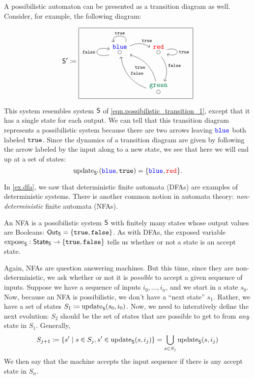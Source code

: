 \documentclass[DynamicalBook]{subfiles}
\begin{document}
\begin{example}\label{ex.transition_possible}
  A possibilistic automaton can be presented as a transition diagram as well.
  Consider, for example, the following diagram:

\begin{equation}\label{eqn.transition_possible}  
\Sys{S'} \coloneqq
  \begin{tikzpicture}[baseline=(bl)]
	\node[draw] (bl) {
  \begin{tikzcd}[column sep=small]
    \LMO{\Blue} \ar[out=60, in=120, looseness=2, "\true"'] \ar[loop left, "\const{false}"] \ar[rr, bend left, "\const{true}"]  &  & \LMO{\Red} \ar[loop right, "\true"] \ar[dd, bend left, "\const{false}" ]\\
    & & \\
     & & \ar[uull, bend right, "\true"]\ar[uull, bend left, "\false"'] \LMO{\Green}
  \end{tikzcd}};
\end{tikzpicture}
\end{equation}

This system resembles system $\mathsf{S}$ of \cref{eqn.possibilistic_transition_1},
except that it has a single state for each output. We can tell that this
transition diagram represents a possibilistic system because there are two
arrows leaving ${\color{blue} \mathtt{blue}}$ both labeled $\mathtt{true}$. Since the dynamics of a transition
diagram are given by following the arrow labeled by the input along to a new
state, we see that here we will end up at a set of states:
$$\mathrm{update}_{\mathsf{S'}}({\color{blue} \mathtt{blue}}, \mathtt{true}) = \{{\color{blue} \mathtt{blue}}, {\color{red} \mathtt{red}}\}.$$
\end{example}

\begin{example}\label{ex.nfa}
 In \cref{ex.dfa}, we saw that deterministic finite automata (DFAs) are examples of
 deterministic systems. There is another common notion in automata theory:
 \emph{non-deterministic} finite automata (NFAs). 

 An NFA is a possibilistic system $\mathsf{S}$ with finitely many states whose
 output values are Booleans: $\mathsf{Out}_{\mathsf{S}} = \{\mathtt{true}, \mathtt{false}\}$. As with DFAs, the exposed variable $\mathrm{expose}_{\mathsf{S}} : \mathsf{State}_{\mathsf{S}}
 \to \{\mathtt{true}, \mathtt{false}\}$ tells us whether or not a state is an accept state.

 Again, NFAs are question answering machines. But this time, since they are
 non-deterministic, we ask whether or not it is \emph{possible} to accept a
 given sequence of inputs. Suppose we have a sequence of inputs $i_0, \ldots,
 i_n$, and we start in a state $s_0$. Now, because an NFA is possibilistic, we
 don't have a ``next state'' $s_1$. Rather, we have a set of states $S_1
 \coloneqq \mathrm{update}_{\mathsf{S}}(s_0, i_0)$. Now, we need to interatively define the next
 evolution: $S_2$ should be the set of states that are possible to get to from
 \emph{any} state in $S_1$. Generally,
 $$S_{j+1} \coloneqq \{s'  \mid s \in S_j, s' \in \mathrm{update}_{\mathsf{S}}(s, i_j) \} = \bigcup_{s \in
   S_j} \mathrm{update}_{\mathsf{S}}(s, i_j)$$
 We then say that the machine accepts the input sequence if there is any accept
 state in $S_n$.
\end{example}
\end{document}
